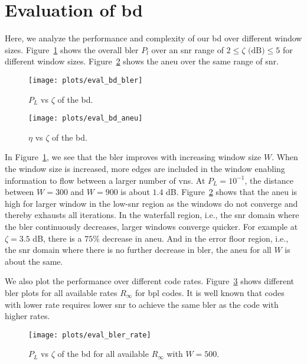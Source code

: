 \section{Evaluation of \texorpdfstring{\acrlong{bd}}{BD}}
Here, we analyze the performance and complexity of our \gls{bd} over different window sizes. Figure~\ref{fig:eval_bd_bler} shows the overall \gls{bler} $P_l$ over an \gls{snr} range of $2\leq\zeta\text{ (dB)}\leq 5$ for different window sizes. Figure~\ref{fig:eval_bd_aneu} shows the \gls{aneu} over the same range of \gls{snr}.
\begin{figure}[htbp]
  \centering
  \texttt{[image: plots/eval\_bd\_bler]}
  \caption[\acrshort{bler} vs \acrshort{snr} of the \acrshort{bd} for $W=300$.]{$P_L$ vs $\zeta$ of the \acrfull{bd}.}
  \label{fig:eval_bd_bler}
\end{figure}
\begin{figure}[htbp]
   \centering
  \texttt{[image: plots/eval\_bd\_aneu]}
  \caption[\acrshort{aneu} vs \acrshort{snr} of the \acrshort{bd} for $W=300$.]{$\eta$ vs $\zeta$ of the \acrfull{bd}.}
  \label{fig:eval_bd_aneu}
\end{figure}

In Figure~\ref{fig:eval_bd_bler}, we see that the \gls{bler} improves with increasing window size $W$. When the window size is increased, more edges are included in the window enabling information to flow between a larger number of \glspl{vn}. At $P_L=10^{-1}$, the distance between $W=300$ and $W=900$ is about $1.4$ dB. Figure~\ref{fig:eval_bd_aneu} shows that the \gls{aneu} is high for larger window in the low-\gls{snr} region as the windows do not converge and thereby exhausts all iterations. In the waterfall region, i.e., the \gls{snr} domain where the \gls{bler} continuously decreases, larger windows converge quicker. For example at $\zeta=3.5$   dB, there is a $75\%$ decrease in \gls{aneu}. And in the error floor region, i.e., the \gls{snr} domain where there is no further decrease in \gls{bler}, the \gls{aneu} for all $W$ is about the same.

We also plot the performance over different code rates. Figure~\ref{fig:eval_bler_rate} shows different \gls{bler} plots for all available rates $R_\infty$ for \gls{bpl} codes. It is well known that codes with lower rate requires lower \gls{snr} to achieve the same \gls{bler} as the code with higher rates.
\begin{figure}[htbp]
  \centering
  \texttt{[image: plots/eval\_bler\_rate]}
  \caption[\acrshort{bler} vs \acrshort{snr} of the \acrshort{bd} for all $R_\infty$.]{$P_L$ vs $\zeta$ of the \acrfull{bd} for all available $R_\infty$ with $W=500$.}
  \label{fig:eval_bler_rate}
\end{figure}

